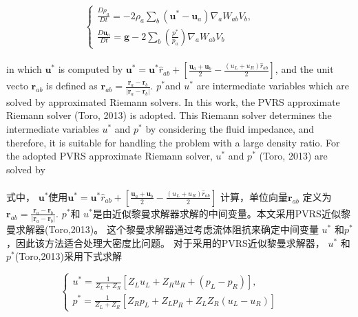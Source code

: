 \documentclass[UTF8]{ctexart}
\begin{document}
\begin{equation}
   \begin{cases} \frac{D \rho_a}{Dt}=-2\rho_a \sum_{b}(\mathbf{u}^*-\mathbf{u}_a)\nabla_a W_{ab} V_b, \\
   \frac{D \mathbf{u}_a}{Dt}=\mathbf{g}-2\sum_{b}(\frac{p^*}{p_a})\nabla_a W_{ab} V_b \end{cases} \qquad 
\end{equation}

\paragraph{\quad}in which $\mathbf{u}^*$ is computed by $\mathbf{u}^* = \mathbf{u}^*\hat{r}_{ab} + [ \frac{\mathbf{u}_a +\mathbf{u}_b}{2}-\frac{(u_L+u_R)\hat{r}_{ab}}{2} ] $, 
                and the unit vecto $\mathbf{r}_{ab}$ is defined as  $\mathbf{r}_{ab} = \frac{\mathbf{r}_a-\mathbf{r}_b}{|\mathbf{r}_a-\mathbf{r}_b|}$. $p^*$and $u^*$ 
                are intermediate variables which are solved by approximated Riemann 
                solvers. In this work, the PVRS approximate Riemann solver (Toro, 2013) 
                is adopted. This Riemann solver determines the intermediate 
                variables $u^*$ and $p^*$ by considering the fluid impedance, and therefore, 
                it is suitable for handling the problem with a large density ratio. 
                For the adopted PVRS approximate Riemann solver, $u^*$ and $p^*$ (Toro, 2013) 
                are solved by
\paragraph{\quad}式中， $\mathbf{u}^*$使用$\mathbf{u}^* = \mathbf{u}^*\hat{r}_{ab} + [ \frac{\mathbf{u}_a +\mathbf{u}_b}{2}-\frac{(u_L+u_R)\hat{r}_{ab}}{2} ] $
                计算，单位向量$\mathbf{r}_{ab}$ 定义为 $\mathbf{r}_{ab} = \frac{\mathbf{r}_a-\mathbf{r}_b}{|\mathbf{r}_a-\mathbf{r}_b|}$.
                $p^*$和 $u^*$是由近似黎曼求解器求解的中间变量。本文采用PVRS近似黎曼求解器(Toro,2013)。
                这个黎曼求解器通过考虑流体阻抗来确定中间变量  $u^*$ 和$p^*$，因此该方法适合处理大密度比问题。
                对于采用的PVRS近似黎曼求解器， $u^*$ 和 $p^*$(Toro,2013)采用下式求解
                
\begin{equation}
   \begin{cases} u^*=\frac{1}{Z_L+Z_R}[Z_L u_L + Z_R u_R +(p_L - p_R)], \\
   p^* = \frac{1}{Z_L + Z_R}[Z_R p_L + Z_L p_R + Z_L Z_R(u_L -u_R)] \end{cases} \qquad 
\end{equation}
\end{document}
